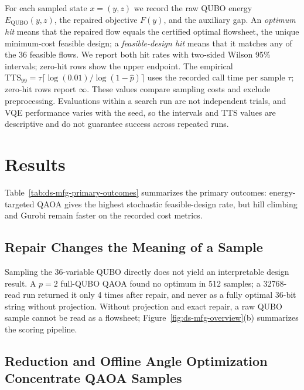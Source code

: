 \documentclass[10pt,letterpaper]{article}
\begin{document}
For each sampled state $x=(y,z)$ we record the raw QUBO energy $E_{\mathrm{QUBO}}(y,z)$, the repaired objective $F(y)$, and the auxiliary gap.
An \emph{optimum hit} means that the repaired flow equals the certified optimal flowsheet, the unique minimum-cost feasible design; a \emph{feasible-design hit} means that it matches any of the 36 feasible flows.
We report both hit rates with two-sided Wilson 95\% intervals; zero-hit rows show the upper endpoint.
The empirical $\mathrm{TTS}_{99}=\tau\lceil\log(0.01)/\log(1-\hat{p})\rceil$ uses the recorded call time per sample $\tau$; zero-hit rows report $\infty$.
These values compare sampling costs and exclude preprocessing.
Evaluations within a search run are not independent trials, and VQE performance varies with the seed, so the intervals and TTS values are descriptive and do not guarantee success across repeated runs.

\section{Results}
\label{sec:ds-mfg-results}

Table~\ref{tab:ds-mfg-primary-outcomes} summarizes the primary outcomes: energy-targeted QAOA gives the highest stochastic feasible-design rate, but hill climbing and Gurobi remain faster on the recorded cost metrics.

\subsection{Repair Changes the Meaning of a Sample}
\label{subsec:ds-mfg-repair-meaning}

Sampling the 36-variable QUBO directly does not yield an interpretable design result.
A $p=2$ full-QUBO QAOA found no optimum in 512 samples; a 32768-read run returned it only 4 times after repair, and never as a fully optimal 36-bit string without projection.
Without projection and exact repair, a raw QUBO sample cannot be read as a flowsheet; Figure~\ref{fig:ds-mfg-overview}(b) summarizes the scoring pipeline.

\subsection{Reduction and Offline Angle Optimization Concentrate QAOA Samples}
\label{subsec:ds-mfg-qaoa-main}
\end{document}
